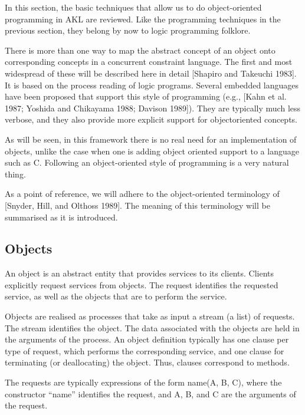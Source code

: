In this section, the basic techniques that allow us to do
object-oriented programming in AKL are reviewed.  Like the programming
techniques in the previous section, they belong by now to logic
programming folklore.

There is more than one way to map the abstract concept of an object
onto corresponding concepts in a concurrent constraint language.  The
first and most wide\-spread of these will be described here in detail
[Shapiro and Takeuchi 1983].  It is based on the process reading of
logic programs.  Several embedded languages have been proposed that
support this style of programming (e.g., [Kahn et al.  1987; Yoshida
and Chikayama 1988; Davison 1989]).  They are typically much less
verbose, and they also provide more explicit support for
objectoriented concepts.

As will be seen, in this framework there is no real need for an
implementation of objects, unlike the case when one is adding object
oriented support to a language such as C.  Following an object-oriented
style of programming is a very natural thing.

As a point of reference, we will adhere to the object-oriented
terminology of [Snyder, Hill, and Olthoss 1989].  The meaning of this
terminology will be summarised as it is introduced.

\subsection{Objects}

An object is an abstract entity that provides services to its clients.
Clients explicitly request services from objects.  The request
identifies the requested service, as well as the objects that are to
perform the service.

Objects are realised as processes that take as input a stream (a list)
of requests.  The stream identifies the object.  The data associated
with the objects are held in the arguments of the process.  An object
definition typically has one clause per type of request, which
performs the corresponding service, and one clause for terminating (or
deallocating) the object.  Thus, clauses correspond to methods.

The requests are typically expressions of the form {\prog name(A, B,
C)}, where the constructor ``{\prog name}'' identifies the request,
and {\prog A}, {\prog B}, and {\prog C} are the arguments of the
request.

